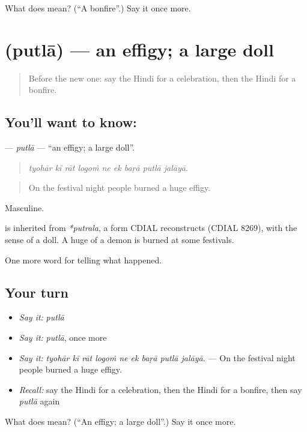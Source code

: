 \begin{tcolorbox}[breakable,colback=teal!4,colframe=teal!35!black,title={Before you move on}]
What does  mean? (\textquotedblleft{}A bonfire\textquotedblright{}.) Say it once more.
\end{tcolorbox}
\section[\texorpdfstring{\hi{पुतला} (putlā)}{पुतला (putlā)}]{ (putlā) — an effigy; a large doll}

\label{lesson:HI-C332-putla}



\begin{quote}
Before the new one: say the Hindi for a celebration, then the Hindi for a bonfire.
\end{quote}

\subsection*{You'll want to know: }
\textbf{} — \emph{putlā} — \textquotedblleft{}an effigy; a large doll\textquotedblright{}.

\begin{quote}
        
\end{quote}

\begin{quote}
\emph{tyohār kī rāt logoṁ ne ek baṛā putlā jalāyā.}
\end{quote}

\begin{quote}
On the festival night people burned a huge effigy.
\end{quote}

Masculine.

\begin{cousinweb}
is inherited from \emph{*putrala}, a form CDIAL reconstructs (CDIAL 8269), with the sense of a doll. A huge \textbf{} of a demon is burned at some festivals.
\end{cousinweb}

\begin{grammarlens}[title={What you've built}]
One more word for telling what happened.
\end{grammarlens}

\subsection*{Your turn}
\begin{itemize}
\raggedright
  \item \emph{Say it:} \emph{putlā}
  \item \emph{Say it:} \emph{putlā}, once more
  \item \emph{Say it:} \emph{tyohār kī rāt logoṁ ne ek baṛā putlā jalāyā.} — On the festival night people burned a huge effigy.
  \item \emph{Recall:} say the Hindi for a celebration, then the Hindi for a bonfire, then say \emph{putlā} again
\end{itemize}

\begin{tcolorbox}[breakable,colback=teal!4,colframe=teal!35!black,title={Before you move on}]
What does  mean? (\textquotedblleft{}An effigy; a large doll\textquotedblright{}.) Say it once more.
\end{tcolorbox}
